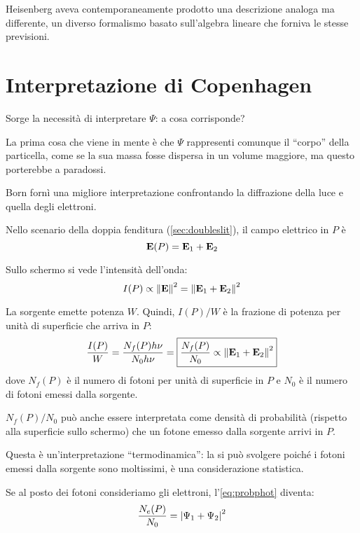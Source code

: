 Heisenberg aveva contemporaneamente prodotto una descrizione analoga ma differente, un diverso formalismo basato sull'algebra lineare che forniva le stesse previsioni.

\section{Interpretazione di Copenhagen}

Sorge la necessità di interpretare $\Psi$: a cosa corrisponde?

La prima cosa che viene in mente è che $\Psi$ rappresenti comunque il ``corpo'' della particella, come se la sua massa fosse dispersa in un volume maggiore, ma questo porterebbe a paradossi.

Born fornì una migliore interpretazione confrontando la diffrazione della luce e quella degli elettroni.

Nello scenario della doppia fenditura (\autoref{sec:doubleslit}), il campo elettrico in $P$ è
\begin{equation}
    \mathbf{E}(P) = \mathbf{E}_1 + \mathbf{E}_2
\end{equation}

Sullo schermo si vede l'intensità dell'onda:
\begin{equation}
    I(P) \propto \left\lVert \mathbf{E} \right\rVert^2 = \left\lVert \mathbf{E}_1 + \mathbf{E}_2 \right\rVert^2
\end{equation}

La sorgente emette potenza $W$.
Quindi, $I(P)/W$ è la frazione di potenza per unità di superficie che arriva in $P$:
\begin{equation}
\label{eq:probphot}
    \frac{I(P)}{W}
    = \frac{N_f(P) h \nu}{N_0 h \nu}
    = \boxed{\frac{N_f(P)}{N_0}
    \propto \left\lVert \mathbf{E}_1 + \mathbf{E}_2 \right\rVert^2}
\end{equation}
dove $N_f(P)$ è il numero di fotoni per unità di superficie in $P$ e $N_0$ è il numero di fotoni emessi dalla sorgente.

$N_f(P)/N_0$ può anche essere interpretata come densità di probabilità (rispetto alla superficie sullo schermo) che un fotone emesso dalla sorgente arrivi in $P$.

Questa è un'interpretazione ``termodinamica'': la si può svolgere poiché i fotoni emessi dalla sorgente sono moltissimi, è una considerazione statistica.

Se al posto dei fotoni consideriamo gli elettroni, l'\cref{eq:probphot} diventa:
\begin{equation}
    \frac{N_e(P)}{N_0} = \left\lvert \Psi_1 + \Psi_2 \right\rvert^2
\end{equation}

